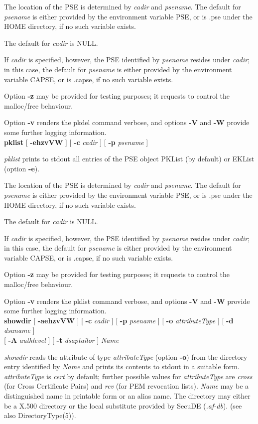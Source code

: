 The location of the PSE is determined by {\em cadir} and {\em psename}. The default for {\em 
psename} is either provided by the environment variable PSE, or is .pse under the HOME directory, if no such
variable exists.
 
The default for {\em cadir} is NULL. 

If {\em cadir} is specified,
however, the PSE identified by {\em psename} resides under {\em cadir}; in this case, the default
for {\em psename} is either provided by the environment variable CAPSE, or is .capse, if no such variable
exists.
 
Option {\bf -z} may be provided for testing purposes; it requests to control the malloc/free behaviour.

Option {\bf -v} renders the pkdel command verbose, and options {\bf -V} and {\bf -W} 
provide some further logging
information.
\\ [1em] 
{\bf pklist} [ {\bf -ehzvVW} ] [ {\bf -c} {\em cadir} ] [ {\bf -p} {\em psename} ]

{\em pklist} prints to stdout all entries of the PSE object PKList (by default)
or EKList (option {\bf -e}).
 
The location of the PSE is determined by {\em cadir} and {\em psename}. The default for {\em 
psename} is either provided by the environment variable PSE, or is .pse under the HOME directory, if no such
variable exists.
 
The default for {\em cadir} is NULL. 

If {\em cadir} is specified,
however, the PSE identified by {\em psename} resides under {\em cadir}; in this case, the default
for {\em psename} is either provided by the environment variable CAPSE, or is .capse, if no such variable
exists.
 
Option {\bf -z} may be provided for testing purposes; it requests to control the malloc/free behaviour.

Option {\bf -v} renders the pklist command verbose, and options {\bf -V} and {\bf -W} 
provide some further logging information.
\\ [1em]
{\bf showdir} [ {\bf -aehzvVW} ] [ {\bf -c} {\em cadir} ] [ {\bf -p} {\em psename} ] [ {\bf -o} {\em attributeType} ] [ {\bf -d} {\em dsaname} ] \\
\hspace*{2cm} [ {\bf -A} {\em authlevel} ] [ {\bf -t} {\em dsaptailor} ] {\em Name}

{\em showdir} reads the attribute of type {\em attributeType} (option {\bf -o}) from the directory entry
identified by {\em Name} and prints its contents to stdout in a suitable form.
{\em attributeType} is {\em cert} by default; further possible values for {\em attributeType} are
{\em cross} (for Cross Certificate Pairs) and {\em rev} (for PEM revocation lists).
{\em Name} may be a distinguished name in printable form or an alias name.
The directory may either be a X.500 directory or the local substitute provided by 
SecuDE ({\em .af-db}). (see also DirectoryType(5)).
 
